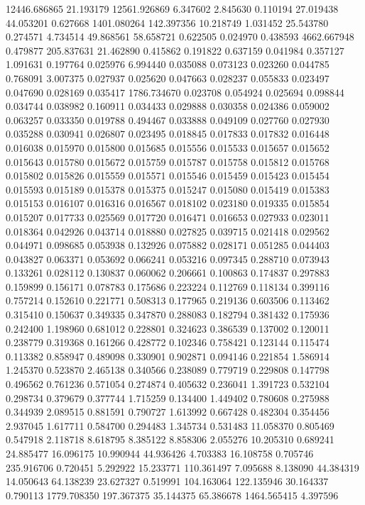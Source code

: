 12446.686865
21.193179
12561.926869
6.347602
2.845630
0.110194
27.019438
44.053201
0.627668
1401.080264
142.397356
10.218749
1.031452
25.543780
0.274571
4.734514
49.868561
58.658721
0.622505
0.024970
0.438593
4662.667948
0.479877
205.837631
21.462890
0.415862
0.191822
0.637159
0.041984
0.357127
1.091631
0.197764
0.025976
6.994440
0.035088
0.073123
0.023260
0.044785
0.768091
3.007375
0.027937
0.025620
0.047663
0.028237
0.055833
0.023497
0.047690
0.028169
0.035417
1786.734670
0.023708
0.054924
0.025694
0.098844
0.034744
0.038982
0.160911
0.034433
0.029888
0.030358
0.024386
0.059002
0.063257
0.033350
0.019788
0.494467
0.033888
0.049109
0.027760
0.027930
0.035288
0.030941
0.026807
0.023495
0.018845
0.017833
0.017832
0.016448
0.016038
0.015970
0.015800
0.015685
0.015556
0.015533
0.015657
0.015652
0.015643
0.015780
0.015672
0.015759
0.015787
0.015758
0.015812
0.015768
0.015802
0.015826
0.015559
0.015571
0.015546
0.015459
0.015423
0.015454
0.015593
0.015189
0.015378
0.015375
0.015247
0.015080
0.015419
0.015383
0.015153
0.016107
0.016316
0.016567
0.018102
0.023180
0.019335
0.015854
0.015207
0.017733
0.025569
0.017720
0.016471
0.016653
0.027933
0.023011
0.018364
0.042926
0.043714
0.018880
0.027825
0.039715
0.021418
0.029562
0.044971
0.098685
0.053938
0.132926
0.075882
0.028171
0.051285
0.044403
0.043827
0.063371
0.053692
0.066241
0.053216
0.097345
0.288710
0.073943
0.133261
0.028112
0.130837
0.060062
0.206661
0.100863
0.174837
0.297883
0.159899
0.156171
0.078783
0.175686
0.223224
0.112769
0.118134
0.399116
0.757214
0.152610
0.221771
0.508313
0.177965
0.219136
0.603506
0.113462
0.315410
0.150637
0.349335
0.347870
0.288083
0.182794
0.381432
0.175936
0.242400
1.198960
0.681012
0.228801
0.324623
0.386539
0.137002
0.120011
0.238779
0.319368
0.161266
0.428772
0.102346
0.758421
0.123144
0.115474
0.113382
0.858947
0.489098
0.330901
0.902871
0.094146
0.221854
1.586914
1.245370
0.523870
2.465138
0.340566
0.238089
0.779719
0.229808
0.147798
0.496562
0.761236
0.571054
0.274874
0.405632
0.236041
1.391723
0.532104
0.298734
0.379679
0.377744
1.715259
0.134400
1.449402
0.780608
0.275988
0.344939
2.089515
0.881591
0.790727
1.613992
0.667428
0.482304
0.354456
2.937045
1.617711
0.584700
0.294483
1.345734
0.531483
11.058370
0.805469
0.547918
2.118718
8.618795
8.385122
8.858306
2.055276
10.205310
0.689241
24.885477
16.096175
10.990944
44.936426
4.703383
16.108758
0.705746
235.916706
0.720451
5.292922
15.233771
110.361497
7.095688
8.138090
44.384319
14.050643
64.138239
23.627327
0.519991
104.163064
122.135946
30.164337
0.790113
1779.708350
197.367375
35.144375
65.386678
1464.565415
4.397596

